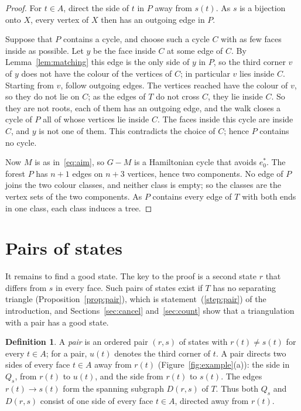 \documentclass[a4paper]{amsart}
\numberwithin{equation}{section}
\theoremstyle{definition}
\newtheorem{definition}[equation]{Definition}
\begin{document}
\begin{proof}
For $t\in A$, direct the side of $t$ in $P$ away from $s(t)$.
As $s$ is a bijection onto $X$, every vertex of $X$ then has an outgoing edge in $P$.

Suppose that $P$ contains a cycle, and choose such a cycle $C$ with as few faces inside as possible.
Let $y$ be the face inside $C$ at some edge of $C$.
By Lemma~\ref{lem:matching} this edge is the only side of $y$ in $P$, so the third corner $v$ of $y$ does not have the colour of the vertices of $C$; in particular $v$ lies inside $C$.
Starting from $v$, follow outgoing edges.
The vertices reached have the colour of $v$, so they do not lie on $C$; as the edges of $T$ do not cross $C$, they lie inside $C$.
So they are not roots, each of them has an outgoing edge, and the walk closes a cycle of $P$ all of whose vertices lie inside $C$.
The faces inside this cycle are inside $C$, and $y$ is not one of them.
This contradicts the choice of $C$; hence $P$ contains no cycle.

Now $M$ is as in~\eqref{eq:aim}, so $G-M$ is a Hamiltonian cycle that avoids $e_0^*$.
The forest $P$ has $n+1$ edges on $n+3$ vertices, hence two components.
No edge of $P$ joins the two colour classes, and neither class is empty; so the classes are the vertex sets of the two components.
As $P$ contains every edge of $T$ with both ends in one class, each class induces a tree.
\end{proof}

\section{Pairs of states}\label{sec:pairs}

It remains to find a good state.
The key to the proof is a second state $r$ that differs from $s$ in every face.
Such pairs of states exist if $T$ has no separating triangle (Proposition~\ref{prop:pair}), which is statement~(\ref{step:pair}) of the introduction, and Sections~\ref{sec:cancel} and~\ref{sec:count} show that a triangulation with a pair has a good state.

\begin{definition}\label{def:pair}
A \emph{pair} is an ordered pair $(r,s)$ of states with $r(t)\neq s(t)$ for every $t\in A$; for a pair, $u(t)$ denotes the third corner of $t$.
A pair directs two sides of every face $t\in A$ away from $r(t)$ (Figure~\ref{fig:example}(a)): the side in $Q_s$, from $r(t)$ to $u(t)$, and the side from $r(t)$ to $s(t)$.
The edges $r(t)\to s(t)$ form the spanning subgraph $D(r,s)$ of $T$.
Thus both $Q_s$ and $D(r,s)$ consist of one side of every face $t\in A$, directed away from $r(t)$.
\end{definition}
\end{document}
